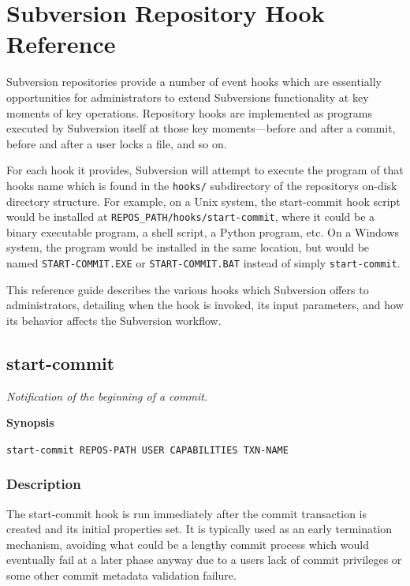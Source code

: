 \chapter{Subversion Repository Hook Reference}\label{svn.ref.reposhooks}

Subversion repositories provide a number of event hooks which are
essentially opportunities for administrators to extend
Subversion\textquotesingle s functionality at key moments of key
operations. Repository hooks are implemented as programs executed by
Subversion itself at those key moments---before and after a commit,
before and after a user locks a file, and so on.

For each hook it provides, Subversion will attempt to execute the
program of that hook\textquotesingle s name which is found in the
\texttt{hooks/} subdirectory of the repository\textquotesingle s on-disk
directory structure. For example, on a Unix system, the start-commit
hook script would be installed at
\texttt{REPOS\_PATH/hooks/start-commit}, where it could be a binary
executable program, a shell script, a Python program, etc. On a Windows
system, the program would be installed in the same location, but would
be named \texttt{START-COMMIT.EXE} or \texttt{START-COMMIT.BAT} instead
of simply \texttt{start-commit}.

This reference guide describes the various hooks which Subversion offers
to administrators, detailing when the hook is invoked, its input
parameters, and how its behavior affects the Subversion workflow.

\section{start-commit}\label{svn.ref.reposhooks.start-commit}

\emph{Notification of the beginning of a commit.}

\textbf{Synopsis}

\texttt{start-commit\ REPOS-PATH\ USER\ CAPABILITIES\ TXN-NAME}

\subsection{Description}

The start-commit hook is run immediately after the commit transaction is
created and its initial properties set. It is typically used as an early
termination mechanism, avoiding what could be a lengthy commit process
which would eventually fail at a later phase anyway due to a
user\textquotesingle s lack of commit privileges or some other commit
metadata validation failure.

